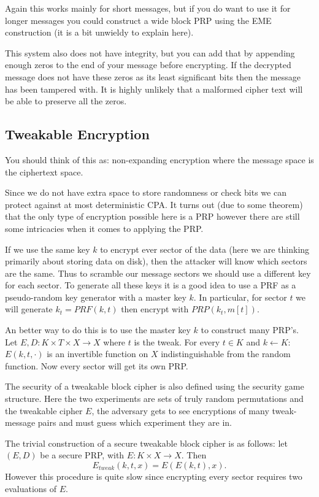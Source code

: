 \documentclass[twoside]{article}
\begin{document}
Again this works mainly for short messages, but if you do want to use it for longer messages you could construct a wide block PRP using the EME construction (it is a bit unwieldy to explain here). 

This system also does not have integrity, but you can add that by appending enough zeros to the end of your message before encrypting. If the decrypted message does not have these zeros as its least significant bits then the message has been tampered with. It is highly unlikely that a malformed cipher text will be able to preserve all the zeros.

\subsection{Tweakable Encryption}
You should think of this as: non-expanding encryption where the message space is the ciphertext space.

Since we do not have extra space to store randomness or check bits we can protect against at most deterministic CPA. It turns out (due to some theorem) that the only type of encryption possible here is a PRP however there are still some intricacies when it comes to applying the PRP.

If we use the same key $k$ to encrypt ever sector of the data (here we are thinking primarily about storing data on disk), then the attacker will know which sectors are the same. Thus to scramble our message sectors we should use a different key for each sector. To generate all these keys it is a good idea to use a PRF as a pseudo-random key generator with a master key $k$. In particular, for sector $t$ we will generate $k_t = PRF(k, t)$ then encrypt with $PRP(k_t, m[t])$.

An better way to do this is to use the master key $k$ to construct many PRP's. Let $E, D: K \times T \times X \rightarrow X$ where $t$ is the tweak. For every $t \in K$ and $k \leftarrow K$: $E(k, t, \cdot)$ is an invertible function on $X$ indistinguishable from the random function. Now every sector will get its own PRP.

The security of a tweakable block cipher is also defined using the security game structure. Here the two experiments are sets of truly random permutations and the tweakable cipher $E$, the adversary gets to see encryptions of many tweak-message pairs and must guess which experiment they are in.

The trivial construction of a secure tweakable block cipher is as follows: let $(E, D)$ be a secure PRP, with $E: K \times X \rightarrow X$. Then
\[E_{tweak}(k, t, x) = E(E(k, t), x).\]
However this procedure is quite slow since encrypting every sector requires two evaluations of $E$.
\end{document}

